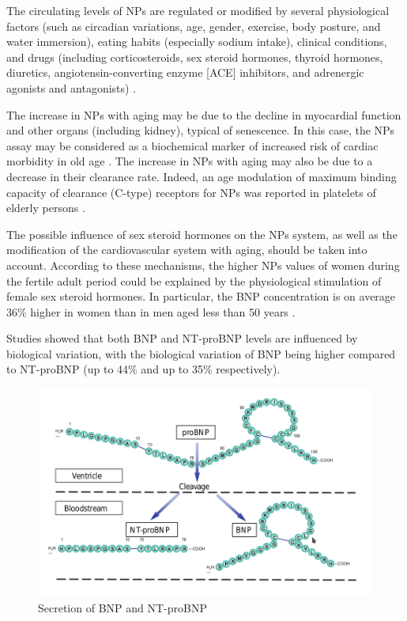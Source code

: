\documentclass[14pt,a4paper,onecolumn]{extarticle}
\begin{document}
The circulating levels of NPs are regulated or modified by several physiological factors (such as circadian variations, age, gender, exercise, body posture, and water immersion), eating habits (especially sodium intake), clinical conditions, and drugs (including corticosteroids, sex steroid hormones, thyroid hormones, diuretics, angiotensin-converting enzyme [ACE] inhibitors, and adrenergic agonists and antagonists) \citep{bib31} \citep{bib32} \citep{bib33} \citep{bib34} \citep{bib35} \citep{bib36}. %

The increase in NPs with aging may be due to the decline in myocardial function and other organs (including kidney), typical of senescence. In this case, the NPs assay may be considered as a biochemical marker of increased risk of cardiac morbidity in old age \citep{bib316}.  The increase in NPs with aging may also be due to a decrease in their clearance rate. Indeed, an age modulation of maximum binding capacity of clearance (C-type) receptors for NPs was reported in platelets of elderly persons \citep{bib317}. %

The possible influence of sex steroid hormones on the NPs system, as well as the modification of the cardiovascular system with aging, should be taken into account. According to these mechanisms, the higher NPs values of women during the fertile adult period could be explained by the physiological stimulation of female sex steroid hormones. In particular, the BNP concentration is on average 36\% higher in women than in men aged less than 50 years \citep{bib37}. %

Studies showed that both BNP and NT-proBNP levels are influenced by biological variation, with the biological variation of BNP being higher compared to NT-proBNP (up to 44\% and up to 35\% respectively). \citep{Bruins2004} \citep{Wu2003b} %

\begin{figure}      \centering      \includegraphics[scale=0.4]{../../images/BNP_secretion.png}      \small\caption{Secretion of BNP and NT-proBNP}      \label{BNP_secretion}  \end{figure} %
\end{document}
